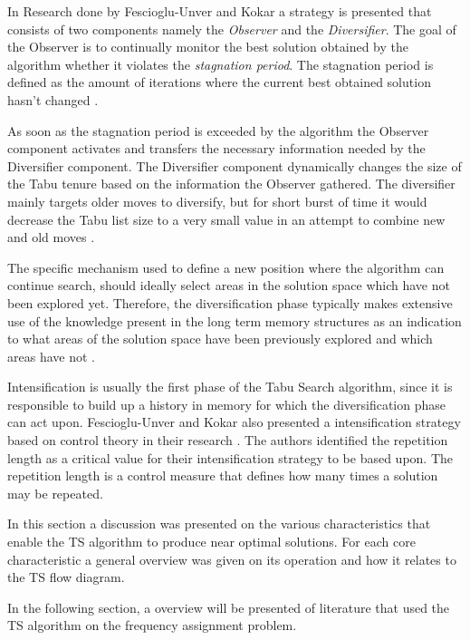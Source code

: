 In Research done by Fescioglu-Unver and Kokar \cite{SelfControllingReactiveTabu} a strategy is presented that consists of two components namely the \emph{Observer} and the \emph{Diversifier}. The goal of the Observer is to continually monitor the best solution obtained by the algorithm whether it violates the \emph{stagnation period}. The stagnation period is defined as the amount of iterations where the current best obtained solution hasn't changed \cite{SelfControllingReactiveTabu}. 

As soon as the stagnation period is exceeded by the algorithm the Observer component activates and transfers the necessary information needed by the Diversifier component. The Diversifier component dynamically changes the size of the Tabu tenure based on the information the Observer gathered. The diversifier mainly targets older moves to diversify, but for short burst of time it would decrease the Tabu list size to a very small value in an attempt to combine new and old moves \cite{SelfControllingReactiveTabu}.

The specific mechanism used to define a new position where the algorithm can continue search, should ideally select areas in the solution space which have not been explored yet. Therefore, the diversification phase typically makes extensive use of the knowledge present in the long term memory structures as an indication to what areas of the solution space have been previously explored and which areas have not \cite{TabuParameterization,TabuCrewSchedulingProblem,NonlinearGlobalTabu,SelfControllingReactiveTabu}.

Intensification is usually the first phase of the Tabu Search algorithm, since it is responsible to build up a history in memory for which the diversification phase can act upon. Fescioglu-Unver and Kokar also presented a intensification strategy based on control theory in their research \cite{SelfControllingReactiveTabu}. The authors identified the repetition length as a critical value for their intensification strategy to be based upon. The repetition length is a control measure that defines how many times a solution may be repeated.

In this section a discussion was presented on the various characteristics that enable the TS algorithm to produce near optimal solutions. For each core characteristic a general overview was given on its operation and how it relates to the TS flow diagram.

In the following section, a overview will be presented of literature that used the TS algorithm on the frequency assignment problem.
